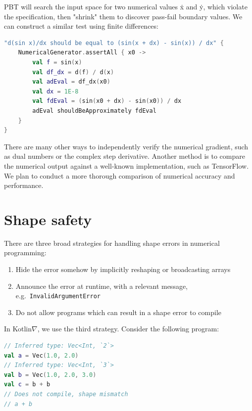 \documentclass[12pt,initial,twoside,maitrise]{dms}
\numberwithin{equation}{section}
\numberwithin{table}{chapter}
\numberwithin{figure}{chapter}
\begin{document}
PBT will search the input space for two numerical values ẋ and ẏ, which violate the specification, then "shrink" them to discover pass-fail boundary values. We can construct a similar test using finite differences:

\begin{lstlisting}[language=Kotlin, showstringspaces=false]
"d(sin x)/dx should be equal to (sin(x + dx) - sin(x)) / dx" {
    NumericalGenerator.assertAll { x0 ->
        val f = sin(x)
        val df_dx = d(f) / d(x)
        val adEval = df_dx(x0)
        val dx = 1E-8
        val fdEval = (sin(x0 + dx) - sin(x0)) / dx
        adEval shouldBeApproximately fdEval
    }
}
\end{lstlisting}

There are many other ways to independently verify the numerical gradient, such as dual numbers or the complex step derivative. Another method is to compare the numerical output against a well-known implementation, such as TensorFlow. We plan to conduct a more thorough comparison of numerical accuracy and performance.

\section{Shape safety}\label{sec:shape-safety}

\noindent There are three broad strategies for handling shape errors in numerical programming: \\

\begin{enumerate}
    \item Hide the error somehow by implicitly reshaping or broadcasting arrays
    \item Announce the error at runtime, with a relevant message, e.g.~\texttt{InvalidArgumentError}
    \item Do not allow programs which can result in a shape error to compile \\
\end{enumerate}

\noindent In Kotlin$\nabla$, we use the third strategy. Consider the following program:

\begin{lstlisting}[language=Kotlin]
// Inferred type: Vec<Int, `2`>
val a = Vec(1.0, 2.0)
// Inferred type: Vec<Int, `3`>
val b = Vec(1.0, 2.0, 3.0)
val c = b + b
// Does not compile, shape mismatch
// a + b
\end{lstlisting}
\end{document}
